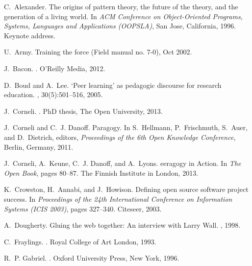 \documentclass{acm_proc_article-sp}
\begin{document}
% 

\begin{thebibliography}{10}

C.~Alexander.
\newblock The origins of pattern theory, the future of the theory, and the
  generation of a living world.
\newblock In {\em {A}{C}{M} {C}onference on {O}bject-{O}riented {P}rograms,
  {S}ystems, {L}anguages and {A}pplications ({O}{O}{P}{S}{L}{A})}, San Jose,
  California, 1996.
\newblock Keynote address.

U.~Army.
\newblock Training the force {(Field} manual no. 7-0), Oct 2002.

J.~Bacon.
.
\newblock O'Reilly Media, 2012.

D.~Boud and A.~Lee.
\newblock `{P}eer learning' as pedagogic discourse for research education.
, 30(5):501--516, 2005.

J.~Corneli.
.
\newblock PhD thesis, The Open University, 2013.

J.~Corneli and C.~J. Danoff.
\newblock Paragogy.
\newblock In S.~Hellmann, P.~Frischmuth, S.~Auer, and D.~Dietrich, editors,
  {\em Proceedings of the 6th Open Knowledge Conference}, Berlin, Germany,
  2011.

J.~Corneli, A.~Keune, C.~J. Danoff, and A.~Lyons.
eeragogy in {A}ction.
\newblock In {\em The Open Book}, pages 80--87. The Finnish Institute in
  London, 2013.

K.~Crowston, H.~Annabi, and J.~Howison.
\newblock Defining open source software project success.
\newblock In {\em Proceedings of the 24th {I}nternational {C}onference on
  {I}nformation {S}ystems ({I}{C}{I}{S} 2003)}, pages 327--340. Citeseer, 2003.

A.~Dougherty.
\newblock Gluing the web together: An interview with {L}arry {W}all.
, 1998.

C.~Fraylings.
.
\newblock Royal College of Art London, 1993.

R.~P. Gabriel.
.
\newblock Oxford University Press, New York, 1996.


\end{thebibliography}
\end{document}
